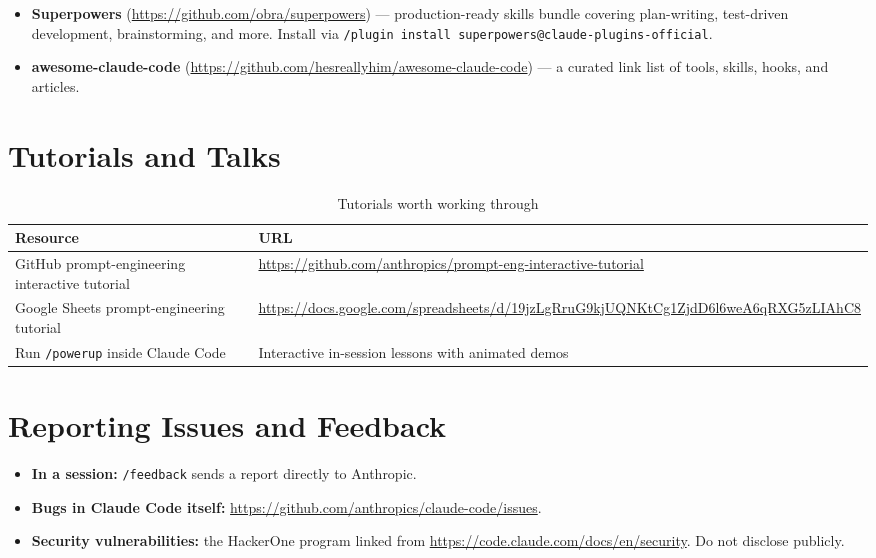 \begin{itemize}
  \item \textbf{Superpowers} (\url{https://github.com/obra/superpowers}) —
        production-ready skills bundle covering plan-writing,
        test-driven development, brainstorming, and more. Install via
        \texttt{/plugin install superpowers@claude-plugins-official}.
  \item \textbf{awesome-claude-code}
        (\url{https://github.com/hesreallyhim/awesome-claude-code}) — a
        curated link list of tools, skills, hooks, and articles.
\end{itemize}

\section{Tutorials and Talks}
\label{app:tutorials}

\begin{table}[ht]
\centering
\caption{Tutorials worth working through}
\label{tab:app-tutorials}
\begin{tabularx}{\textwidth}{lX}
\toprule
\textbf{Resource} & \textbf{URL} \\
\midrule
GitHub prompt-engineering interactive tutorial
  & \url{https://github.com/anthropics/prompt-eng-interactive-tutorial} \\
Google Sheets prompt-engineering tutorial
  & \url{https://docs.google.com/spreadsheets/d/19jzLgRruG9kjUQNKtCg1ZjdD6l6weA6qRXG5zLIAhC8} \\
Run \texttt{/powerup} inside Claude Code
  & Interactive in-session lessons with animated demos \\
\bottomrule
\end{tabularx}
\end{table}

\section{Reporting Issues and Feedback}
\label{app:feedback}

\begin{itemize}
  \item \textbf{In a session:} \texttt{/feedback} sends a report
        directly to Anthropic.
  \item \textbf{Bugs in Claude Code itself:}
        \url{https://github.com/anthropics/claude-code/issues}.
  \item \textbf{Security vulnerabilities:} the HackerOne program linked
        from \url{https://code.claude.com/docs/en/security}. Do not
        disclose publicly.
\end{itemize}

